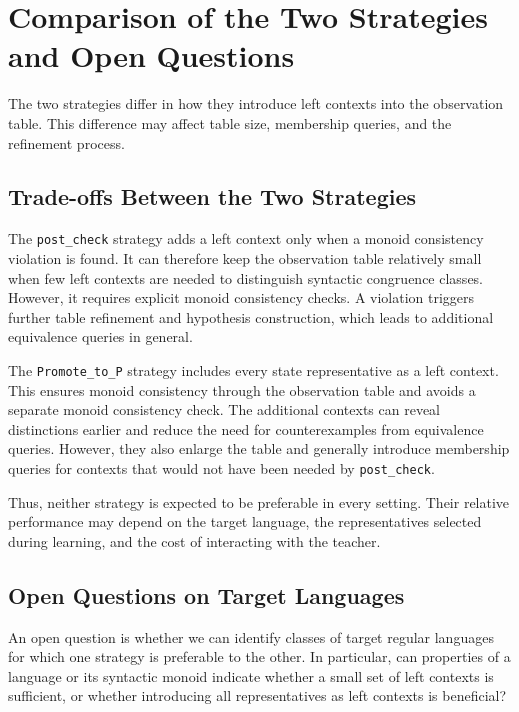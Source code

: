 \documentclass{ieice-tecrep}
\begin{document}
\section{Comparison of the Two Strategies and Open Questions}\label{strategy-comparison}

The two strategies differ in how they introduce left contexts into
the observation table. This difference may affect table size,
membership queries, and the refinement process.

\subsection{Trade-offs Between the Two Strategies}\label{strategy-comparison-characteristics}

The \texttt{post\_check} strategy adds a left context only when a
monoid consistency violation is found. It can therefore keep the
observation table relatively small when few left contexts are needed
to distinguish syntactic congruence classes. However, it requires
explicit monoid consistency checks. A violation triggers further
table refinement and hypothesis construction, which leads to
additional equivalence queries in general. 

The \texttt{Promote\_to\_P} strategy includes every state
representative as a left context. This ensures monoid consistency
through the observation table and avoids a separate monoid
consistency check. The additional contexts can reveal distinctions
earlier and reduce the need for counterexamples from equivalence
queries. However, they also enlarge the table and generally introduce
membership queries for contexts that would not have been needed by
\texttt{post\_check}. 

Thus, neither strategy is expected to be preferable in every
setting. Their relative performance may depend on the target
language, the representatives selected during learning, and the
cost of interacting with the teacher.

\subsection{Open Questions on Target Languages}\label{strategy-comparison-open-questions}

An open question is whether we can identify classes of target
regular languages for which one strategy is preferable to the
other. In particular, can properties of a language or its syntactic
monoid indicate whether a small set of left contexts is sufficient,
or whether introducing all representatives as left contexts is
beneficial?
\end{document}
